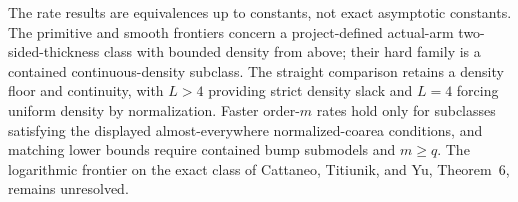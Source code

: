 The rate results are equivalences up to constants, not exact asymptotic constants.  The primitive and smooth frontiers concern a project-defined actual-arm two-sided-thickness class with bounded density from above; their hard family is a contained continuous-density subclass.  The straight comparison retains a density floor and continuity, with \(L>4\) providing strict density slack and \(L=4\) forcing uniform density by normalization.  Faster order-\(m\) rates hold only for subclasses satisfying the displayed almost-everywhere normalized-coarea conditions, and matching lower bounds require contained bump submodels and \(m\geq q\).  The logarithmic frontier on the exact class of Cattaneo, Titiunik, and Yu, Theorem~6, remains unresolved.